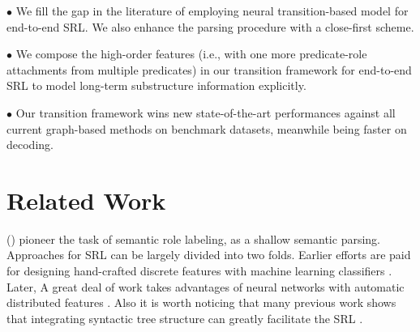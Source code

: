 \documentclass[letterpaper]{article} \usepackage{aaai21}  \usepackage{times}  \usepackage{helvet} \usepackage{courier}  \usepackage[hyphens]{url}  \usepackage{graphicx} \urlstyle{rm} \def\UrlFont{\rm}  \usepackage{natbib}  \usepackage{caption}
\begin{document}
\begin{CJK}{UTF8}{gbsn}
$\bullet$ We fill the gap in the literature of employing neural transition-based model for end-to-end SRL.
We also enhance the parsing procedure with a close-first scheme.


$\bullet$ We compose the high-order features (i.e., with one more predicate-role attachments from multiple predicates) in our transition framework for end-to-end SRL to model long-term substructure information explicitly.


$\bullet$ Our transition framework wins new state-of-the-art performances against all current graph-based methods on benchmark datasets, meanwhile being faster on decoding.




















\section{Related Work}



\citeauthor{gildea-jurafsky-2000-automatic} (\citeyear{gildea-jurafsky-2000-automatic}) pioneer the task of semantic role labeling, as a shallow semantic parsing.
Approaches for SRL can be largely divided into two folds.
Earlier efforts are paid for designing hand-crafted discrete features with machine learning classifiers \cite{pradhan-etal-2005-semantic,PunyakanokRY08,zhao-etal-2009-multilingual-dependency}.
Later, A great deal of work takes advantages of neural networks with automatic distributed features \cite{fitzgerald-etal-2015-semantic,roth-lapata-2016-neural,marcheggiani-titov-2017-encoding,strubell-etal-2018-linguistically,Fei06295}.
Also it is worth noticing that many previous work shows that integrating syntactic tree structure can greatly facilitate the SRL \cite{marcheggiani-etal-2017-simple,zhang-etal-2019-syntax-enhanced,Crossfei9165903}.



\end{CJK}
\end{document}

